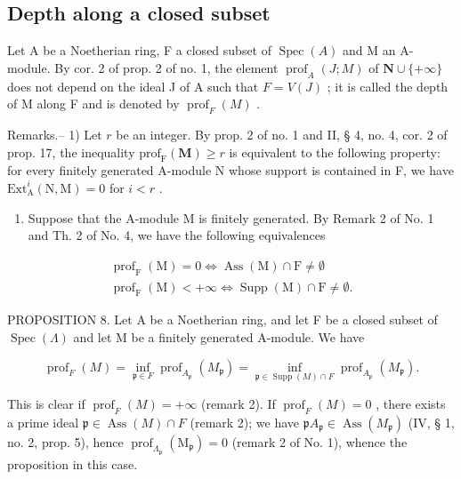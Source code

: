 \subsection{Depth along a closed subset}

Let A be a Noetherian ring, F a closed subset of \(\operatorname{Spec}(A)\) and M an A-module. By cor. 2 of prop. 2 of no. 1, the element \(\operatorname{prof}_{A}(J;M)\) of \(\mathbf{N} \cup \{+\infty\}\) does not depend on the ideal J of A such that \(F = V(J)\) ; it is called the depth of M along F and is denoted by \(\operatorname{prof}_{F}(M)\) .

Remarks.-- 1) Let \(r\) be an integer. By prop. 2 of no. 1 and II, § 4, no. 4, cor. 2 of prop. 17, the inequality \(\mathrm{prof}_{\mathrm{F}}(\mathbf{M}) \geqslant r\) is equivalent to the following property: for every finitely generated A-module N whose support is contained in F, we have \(\mathrm{Ext}_{\mathrm{A}}^{i}(\mathrm{N},\mathrm{M}) = 0\) for \(i < r\) .

\begin{enumerate}
\def\labelenumi{\arabic{enumi})}
\setcounter{enumi}{1}
\tightlist
\item
  Suppose that the A-module M is finitely generated. By Remark 2 of No. 1 and Th. 2 of No. 4, we have the following equivalences
\end{enumerate}

\[
\begin{array}{c} \operatorname{prof} _ {\mathrm{F}} (\mathrm{M}) = 0 \Longleftrightarrow \operatorname{Ass} (\mathrm{M}) \cap \mathrm{F} \neq \emptyset \\ \operatorname{prof} _ {\mathrm{F}} (\mathrm{M}) <   + \infty \Longleftrightarrow \operatorname{Supp} (\mathrm{M}) \cap \mathrm{F} \neq \emptyset . \end{array}
\]

PROPOSITION 8. Let A be a Noetherian ring, and let F be a closed subset of \(\operatorname{Spec}(\Lambda)\) and let M be a finitely generated A-module. We have

\[
\operatorname{prof} _ {F} (M) = \inf _ {\mathfrak {p} \in F} \operatorname{prof} _ {A _ {\mathfrak {p}}} \left(M _ {\mathfrak {p}}\right) = \inf _ {\mathfrak {p} \in \operatorname{Supp} (M) \cap F} \operatorname{prof} _ {A _ {\mathfrak {p}}} \left(M _ {\mathfrak {p}}\right).
\]

This is clear if \(\operatorname{prof}_{F}(M) = +\infty\) (remark 2). If \(\operatorname{prof}_{F}(M) = 0\) , there exists a prime ideal \(\mathfrak{p} \in \operatorname{Ass}(M) \cap F\) (remark 2); we have \(\mathfrak{p}A_{\mathfrak{p}} \in \operatorname{Ass}(M_{\mathfrak{p}})\) (IV, § 1, no. 2, prop. 5), hence \(\operatorname{prof}_{\Lambda_{\mathfrak{p}}}(\mathrm{M}_{\mathfrak{p}}) = 0\) (remark 2 of No. 1), whence the proposition in this case.

